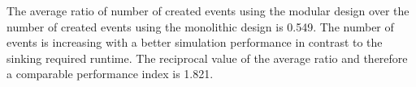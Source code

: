 %   
%   
%   
%   


The average ratio of number of created events using the modular design over the number of created events using the monolithic design is 0.549.
The number of events is increasing with a better simulation performance in contrast to the sinking required runtime.
The reciprocal value of the average ratio and therefore a comparable performance index is 1.821.

